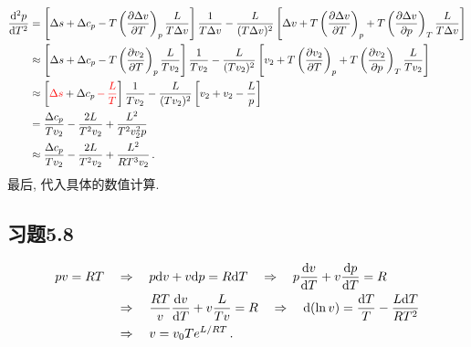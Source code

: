 \documentclass[letterpaper, 10pt]{article}
\begin{document}
\begin{align*}
\frac{{\rm d}^{2} p}{{\rm d} T^{2}} & = \left[ \Delta{s} + \Delta{c_{p}} - T \left( \frac{\partial{\Delta{v}}}{\partial{T}} \right)_{p} \frac{L}{T\Delta{v}} \right] \frac{1}{T\Delta{v}} - \frac{L}{(T\Delta{v})^{2}} \left[ \Delta{v} + T \left( \frac{\partial{\Delta{v}}}{\partial{T}} \right)_{p} + T \left( \frac{\partial{\Delta{v}}}{\partial{p}} \right)_{T} \frac{L}{T\Delta{v}} \right] \nonumber \\
& \approx \left[ \Delta{s} + \Delta{c_{p}} - T \left( \frac{\partial{v_{2}}}{\partial{T}} \right)_{p} \frac{L}{Tv_{2}} \right] \frac{1}{Tv_{2}} - \frac{L}{(Tv_{2})^{2}} \left[ v_{2} + T \left( \frac{\partial{v_{2}}}{\partial{T}} \right)_{p} + T \left( \frac{\partial{v_{2}}}{\partial{p}} \right)_{T} \frac{L}{Tv_{2}} \right] \nonumber \\
& \approx \left[ {\color{red}{\Delta{s}}} + \Delta{c_{p}} {\color{red}{\,-\, \frac{L}{T}}} \right] \frac{1}{Tv_{2}} - \frac{L}{(Tv_{2})^{2}} \left[ v_{2} + v_{2} - \frac{L}{p} \right] \nonumber \\
& = \frac{\Delta{c_{p}}}{Tv_{2}} - \frac{2L}{T^{2}v_{2}} + \frac{L^{2}}{T^{2}v_{2}^{2}p} \nonumber \\
& \approx \frac{\Delta{c_{p}}}{Tv_{2}} - \frac{2L}{T^{2}v_{2}} + \frac{L^{2}}{RT^{3}v_{2}}\,.
\end{align*}
最后, 代入具体的数值计算.

\subsection{习题5.8}
\begin{align*}
pv = RT \quad{} & \Rightarrow \quad{} p {\rm d}{v} + v {\rm d}{p} = R{\rm d}{T} \quad{} \Rightarrow \quad{} p \frac{{\rm d}{v}}{{\rm d}{T}} + v \frac{{\rm d}{p}}{{\rm d}T} = R \nonumber \\
& \Rightarrow \quad{} \frac{RT}{v} \frac{{\rm d}{v}}{{\rm d}{T}} + v \frac{L}{Tv} = R \quad{} \Rightarrow \quad{} {\rm d}(\ln{v}) = \frac{{\rm d}T}{T} - \frac{L{\rm d}T}{RT^{2}} \nonumber \\
& \Rightarrow \quad{} v = v_{0} T e^{L/RT}\,.
\end{align*}
\end{document}
